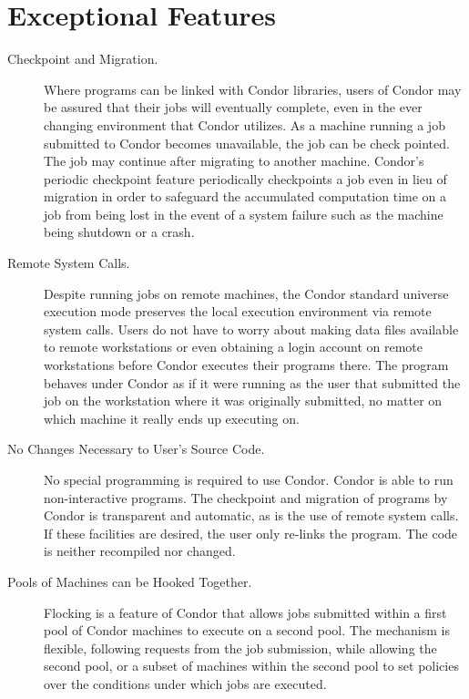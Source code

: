 \section{Exceptional Features}

\begin{description}
	\item[Checkpoint and Migration.] Where programs can be
linked with Condor libraries, users of Condor may be assured that
their jobs will eventually complete,
even in the ever changing environment that Condor
utilizes.
As a machine running a job submitted to Condor
becomes unavailable,
the job can be check pointed.
The job may continue after migrating 
to another machine.
Condor's periodic checkpoint feature 
periodically checkpoints a job even in lieu of migration in order to
safeguard the accumulated computation time on a job from being lost in the
event of a system failure such as the machine being shutdown or a crash.
	\item[Remote System Calls.] 
Despite running jobs on remote machines,
the Condor standard universe execution
mode preserves the local execution environment
via remote system calls. Users do not have to worry
about making data files available to remote workstations or even
obtaining a login account on remote workstations before Condor executes
their programs there. The program behaves under Condor as if it were
running as the user that submitted the job on the workstation where it
was originally submitted, no matter on which machine it really ends up
executing on.
	\item[No Changes Necessary to User's Source Code.] No special
programming is required to use Condor.
Condor is able to run non-interactive programs.
The checkpoint and migration of
programs by Condor is transparent and automatic, as is the use of
remote system calls.
If these facilities are desired, the user only
re-links the program.  The code is neither recompiled nor changed.
	\item[Pools of Machines can be Hooked Together.] Flocking is
a feature of Condor that allows jobs submitted within a first pool of
Condor machines to execute on a second pool.
The mechanism is flexible, following requests from the job
submission,
while allowing the second pool, or a subset of machines within
the second pool to set policies over the conditions under
which jobs are executed.

\end{description}
